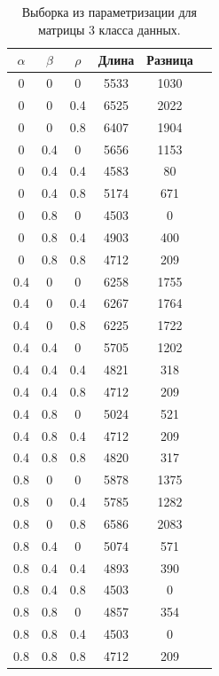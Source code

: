 \documentclass[12pt]{report}
\begin{document}
\begin{table}[H]

	\caption{Выборка из параметризации для матрицы 3 класса данных.}
	\label{tab:v3}
	\begin{center}

		\begin{tabular}{|c@{\hspace{7mm}}|c@{\hspace{7mm}}|c@{\hspace{7mm}}|c@{\hspace{7mm}}|c@{\hspace{7mm}}|c|}

			\hline
			$\alpha$        & $\beta$      & $\rho$      &Длина  & Разница \\

			\hline

0&0&0&5533&1030\\
0&0&0.4&6525&2022\\
0&0&0.8&6407&1904\\
0&0.4&0&5656&1153\\
0&0.4&0.4&4583&80\\
0&0.4&0.8&5174&671\\
0&0.8&0&4503&0\\
0&0.8&0.4&4903&400\\
0&0.8&0.8&4712&209\\
\hline
0.4&0&0&6258&1755\\
0.4&0&0.4&6267&1764\\
0.4&0&0.8&6225&1722\\
0.4&0.4&0&5705&1202\\
0.4&0.4&0.4&4821&318\\
0.4&0.4&0.8&4712&209\\
0.4&0.8&0&5024&521\\
0.4&0.8&0.4&4712&209\\
0.4&0.8&0.8&4820&317\\
\hline
0.8&0&0&5878&1375\\
0.8&0&0.4&5785&1282\\
0.8&0&0.8&6586&2083\\
0.8&0.4&0&5074&571\\
0.8&0.4&0.4&4893&390\\
0.8&0.4&0.8&4503&0\\
0.8&0.8&0&4857&354\\
0.8&0.8&0.4&4503&0\\
0.8&0.8&0.8&4712&209\\
\hline

		\end{tabular}
	\end{center}
\end{table}
\end{document}
